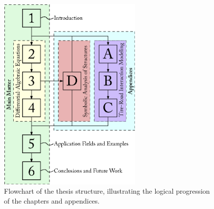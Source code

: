 \begin{figure}[htb]
  \centering
  \includegraphics[width=7.0cm]{./figures/chapter_1/thesis_flowchart}
  \caption{Flowchart of the thesis structure, illustrating the logical progression of the chapters and appendices.}
  \label{chap1:fig:thesis_flowchart}
\end{figure}

